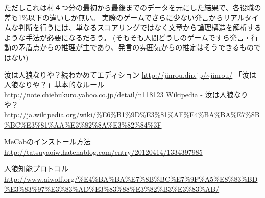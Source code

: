 ﻿\documentclass[a4paper,twocolumn]{jsarticle}
\begin{document}
ただしこれは村４つ分の最初から最後までのデータを元にした結果で、各役職の差も1\%以下の違いしか無い。
実際のゲームでさらに少ない発言からリアルタイムな判断を行うには、単なるスコアリングではなく文章から論理構造を解析するような手法が必要になるだろう。
(そもそも人間どうしのゲームですら発言・行動の矛盾点からの推理が主であり、発言の雰囲気からの推定はそうできるものではない)

\begin{thebibliography}{9}
汝は人狼なりや？続わかめてエディション
\url{http://jinrou.dip.jp/~jinrou/}
「汝は人狼なりや？」基本的なルール
\url{http://note.chiebukuro.yahoo.co.jp/detail/n118123}
Wikipedia - 汝は人狼なりや？
\url{http://ja.wikipedia.org/wiki/%E6%B1%9D%E3%81%AF%E4%BA%BA%E7%8B%BC%E3%81%AA%E3%82%8A%E3%82%84%3F}

MeCabのインストール方法
\url{http://tatsuyaoiw.hatenablog.com/entry/20120414/1334397985}

人狼知能プロトコル
\url{http://www.aiwolf.org/%E4%BA%BA%E7%8B%BC%E7%9F%A5%E8%83%BD%E3%83%97%E3%83%AD%E3%83%88%E3%82%B3%E3%83%AB/}
\end{thebibliography}
\end{document}
